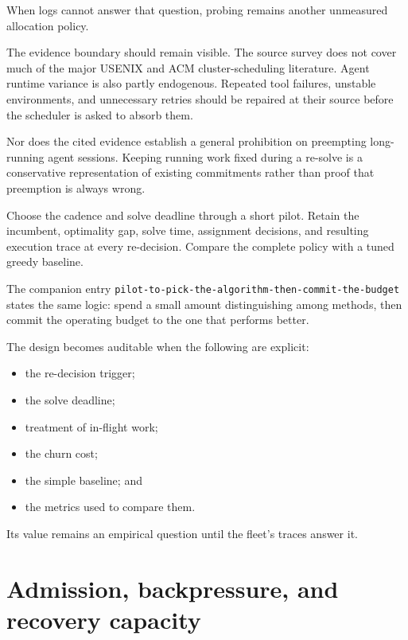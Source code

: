 When logs cannot answer that question, probing remains another unmeasured allocation policy.

The evidence boundary should remain visible. The source survey does not cover much of the major USENIX and ACM cluster-scheduling literature. Agent runtime variance is also partly endogenous. Repeated tool failures, unstable environments, and unnecessary retries should be repaired at their source before the scheduler is asked to absorb them.

Nor does the cited evidence establish a general prohibition on preempting long-running agent sessions. Keeping running work fixed during a re-solve is a conservative representation of existing commitments rather than proof that preemption is always wrong.

Choose the cadence and solve deadline through a short pilot. Retain the incumbent, optimality gap, solve time, assignment decisions, and resulting execution trace at every re-decision. Compare the complete policy with a tuned greedy baseline.

The companion entry \texttt{pilot-to-pick-the-algorithm-then-commit-the-budget} states the same logic: spend a small amount distinguishing among methods, then commit the operating budget to the one that performs better.


The design becomes auditable when the following are explicit:

\begin{itemize}
\tightlist
\item
  the re-decision trigger;
\item
  the solve deadline;
\item
  treatment of in-flight work;
\item
  the churn cost;
\item
  the simple baseline; and
\item
  the metrics used to compare them.
\end{itemize}

Its value remains an empirical question until the fleet's traces answer it.

\hypertarget{admission-backpressure-and-recovery-capacity}{%
\section{Admission, backpressure, and recovery capacity}\label{admission-backpressure-and-recovery-capacity}}

